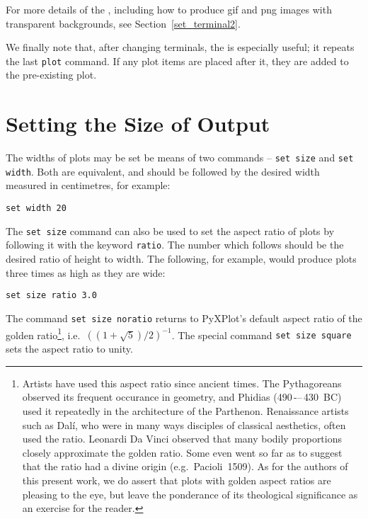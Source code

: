 For more details of the , including how to produce gif
and png images with transparent backgrounds, see Section~\ref{set_terminal2}.

We finally note that, after changing terminals, the  is
especially useful; it repeats the last {\tt plot} command. If any plot items
are placed after it, they are added to the pre-existing plot.

\section{Setting the Size of Output}

The widths of plots may be set be means of two commands -- {\tt set
size} and {\tt set width}. Both are
equivalent, and should be followed by the desired width measured in
centimetres, for example:

\begin{verbatim}
set width 20
\end{verbatim}

The {\tt set size} command can also be used to set the aspect ratio of plots by
following it with the keyword {\tt ratio}. The number
which follows should be the desired ratio of height to width. The following,
for example, would produce plots three times as high as they are wide:

\begin{verbatim}
set size ratio 3.0
\end{verbatim}

\noindent The command {\tt set size noratio} returns to PyXPlot's default
aspect ratio of the golden ratio\footnote{Artists have used this aspect ratio
since ancient times. The Pythagoreans observed its frequent occurance in
geometry, and Phidias (490\,-–\,430~{\scriptsize BC}) used it repeatedly in the
architecture of the Parthenon. Renaissance artists such as Dal\'i, who were in
many ways disciples of classical aesthetics, often used the ratio.  Leonardi Da
Vinci observed that many bodily proportions closely approximate the golden
ratio. Some even went so far as to suggest that the ratio had a divine origin
(e.g.\ Pacioli~1509). As for the authors of this present work, we do assert
that plots with golden aspect ratios are pleasing to the eye, but leave the
ponderance of its theological significance as an exercise for the reader.},
i.e.\ $\left((1+\sqrt{5})/2\right)^{-1}$. The special command {\tt set size
square} sets the aspect ratio to unity.

